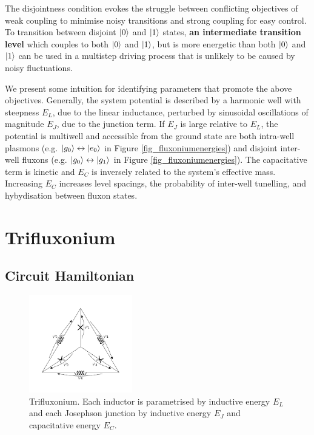 \documentclass[11pt]{article}
\begin{document}

The disjointness condition evokes the struggle between conflicting objectives of weak coupling to minimise noisy transitions and strong coupling for easy control. To transition between disjoint $\ket{0}$ and $\ket{1}$ states, \textbf{an intermediate transition level} which couples to both $\ket{0}$ and $\ket{1}$, but is more energetic than both $\ket{0}$ and $\ket{1}$ can be used in a multistep driving process that is unlikely to be caused by noisy fluctuations.

We present some intuition for identifying parameters that promote the above objectives. Generally, the system potential is described by a harmonic well with steepness $E_L$, due to the linear inductance, perturbed by sinusoidal oscillations of magnitude $E_J$, due to the junction term. If $E_J$ is large relative to $E_L$, the potential is multiwell and accessible from the ground state are both intra-well plasmons (e.g. $\ket{g_0} \leftrightarrow \ket{e_0}$ in Figure \ref{fig_fluxoniumenergies}) and disjoint inter-well fluxons (e.g. $\ket{g_0} \leftrightarrow \ket{g_1}$ in Figure \ref{fig_fluxoniumenergies}). The capacitative term is kinetic and $E_C$ is inversely related to the system's effective mass. Increasing $E_C$ increases level spacings, the probability of inter-well tunelling, and hybydisation between fluxon states.




\section{Trifluxonium}

\subsection{Circuit Hamiltonian}

\begin{figure}[H]
	\centering
	\includegraphics[trim={0cm 1cm 0cm 1cm}, clip, width=0.4\textwidth]{triflux_branch.pdf}
	\caption{Trifluxonium. Each inductor is parametrised by inductive energy $E_L$ and each Josephson junction by inductive energy $E_J$ and capacitative energy $E_C$.}
	\label{fig_triflux}
\end{figure}
\end{document}
